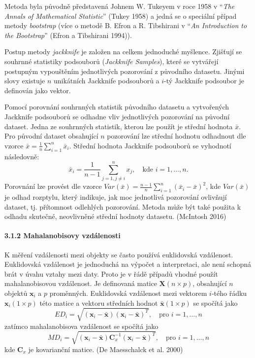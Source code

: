 \documentclass[12pt,]{article}
\let\oldparagraph\paragraph
\renewcommand{\paragraph}[1]{\oldparagraph{#1}\mbox{}}
\begin{document}
\qquad Metoda byla původně představená Johnem W. Tukeyem v roce 1958 v
\enquote{\emph{The Annals of Mathematical Statistic}} (Tukey 1958) a
jedná se o speciální případ metody \emph{bootstrap} (více o metodě B.
Efron a R. Tibshirani v \enquote{\emph{An Introduction to the
Bootstrap}} (Efron a Tibshirani 1994)).

\qquad Postup metody \emph{jackknife} je založen na celkem jednoduché
myšlence. Zjišťují se souhrnné statistiky podsouborů (\emph{Jackknife
Samples}), které se vytvářejí postupným vypouštěním jednotlivých
pozorování z původního datasetu. Jinými slovy existuje \(n\) unikátních
Jackknife podsouborů a \(i\)-tý Jackknife podsoubor je definován jako
vektor.

\qquad Pomocí porovnání souhrnných statistik původního datasetu a
vytvořených Jackknife podsouborů se odhadne vliv jednotlivých pozorování
na původní dataset. Jedna ze souhrnných statistik, kterou lze použít je
střední hodnota \(\bar{x}\). Pro původní dataset obsahující \(n\)
pozorování lze střední hodnotu odhadnout dle vzorce
\(\bar{x} = \frac{1}{n} \sum \limits_{i=1}^{n} \bar{x}_i\). Střední
hodnota Jackknife podsouborů se vyhodnotí následovně:
\[\bar{x}_i = \frac{1}{n-1} \sum \limits_{j=1, j \neq i}^{n} x_j, \quad \text{kde } i=1,\dots,n.\]
Porovnání lze provést dle vzorce
\(\textit{Var}(\bar{x}) = \frac{n-1}{n} \sum \limits_{i=1}^{n}(\bar{x}_i - \bar{x})^2\),
kde \(\textit{Var}(\bar{x})\) je odhad rozptylu, který indikuje, jak moc
jednotlivá pozorování ovlivňují dataset, tj. přítomnost odlehlých
pozorování. Metoda může být také použita k odhadu skutečné, neovlivněné
střední hodnoty datasetu. (McIntosh 2016)

\hypertarget{mbdist}{\paragraph{3.1.2 Mahalanobisovy
vzdálenosti}\label{mbdist}}

\qquad K měření vzdálenosti mezi objekty se často používá euklidovská
vzdálenost. Euklidovská vzdálenost je jednoduchá na výpočet a
interpretaci, ale není schopná brát v úvahu vztahy mezi daty. Proto je v
řádě případů vhodné použít mahalanobisovou vzdálenost. Je definovaná
matice \(\bm{X}(n \times p)\), obsahující \(n\) objektů \(\bm{x}_i\) a
\(p\) proměnných. Euklidovská vzdálenost mezi vektorem \(i\)-tého řádku
\(\bm{x}_i (1 \times p)\) této matice a vektoru středních hodnot
\(\bar{\bm{x}} (1 \times p)\) se spočítá jako
\[ED_i = \sqrt{(\bm{x}_i - \bar{\bm{x}})(\bm{x}_i - \bar{\bm{x}})^T}, \quad \text{pro } i = 1,\dots,n\]
zatímco mahalanobisova vzdálenost se spočítá jako
\[MD_i = \sqrt{(\bm{x}_i - \bar{\bm{x}}) \bm{C}^{-1}_x (\bm{x}_i - \bar{\bm{x}})^T}, \quad \text{pro } i = 1,\dots,n\]
kde \(\bm{C}_x\) je kovarianční matice. (De Maesschalck et al. 2000)
\end{document}
